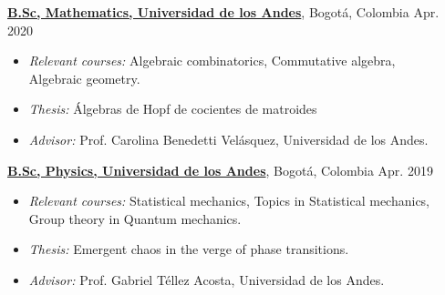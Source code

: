 \documentclass[10pt]{article}
\newenvironment{outerlist}[1][\enskip\textbullet]%
        {\begin{itemize}[#1]}{\end{itemize}%
         \vspace{-0.6\baselineskip}}
\begin{document}
    \vspace{0.5cm}
     \href{https://matematicas.uniandes.edu.co/}{\textbf{B.Sc, Mathematics, Universidad de los Andes}}, Bogotá, Colombia \hfill Apr. 2020
    \begin{outerlist} 
        \item {\it Relevant courses:} Algebraic combinatorics, Commutative algebra,\\ Algebraic geometry.
        \item {\it Thesis:} {Álgebras de Hopf de cocientes de matroides}
        \item {\it Advisor:} Prof. Carolina Benedetti Velásquez, Universidad de los Andes.
         
    \end{outerlist}
    
    \vspace{0.5cm}
    
    \href{https://fisica.uniandes.edu.co/}{\textbf{B.Sc, Physics, Universidad de los Andes}}, Bogotá, Colombia \hfill Apr. 2019 
    \begin{outerlist}
        \item {\it Relevant courses:} Statistical mechanics, Topics in Statistical mechanics,\\ Group theory in Quantum mechanics.
        \item {\it Thesis:} {Emergent chaos in the verge of phase transitions.}
        \item {\it Advisor:} Prof. Gabriel Téllez Acosta, Universidad de los Andes.
    \end{outerlist}

\end{document}
